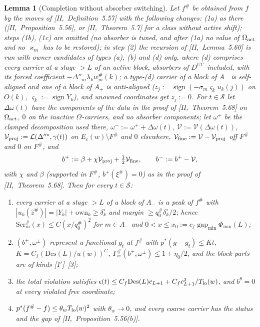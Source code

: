 \documentclass[10pt]{amsart}
\newtheorem{lemma}[theorem]{Lemma}
\theoremstyle{definition}
\theoremstyle{remark}
\newcommand{\sgn}{\operatorname{sign}}
\newcommand{\gap}{\operatorname{gap}}
\newcommand{\zh}{\hat z}
\begin{document}
\begin{lemma}[Completion without absorber switching]\label{lem:III-CMp}
Let $f^\#$ be obtained from $f$ by the moves of [II,~Definition~5.57] with the
following changes: \textup{(1a)} as there \textup{(}[II,~Proposition~5.56], or
[II,~Theorem~5.7] for a class without active shift\textup{)}; steps
\textup{(1b)}, \textup{(1c)} are omitted \textup{(}no absorber is tuned, and
after \textup{(1a)} no value of $\Omega_{\rm act}$ and no $\varkappa_m$ has to be
restored\textup{)}; in step \textup{(2)} the recursion of [II,~Lemma~5.60] is run
with owner candidates of types \textup{(a)}, \textup{(b)} and \textup{(d)} only,
where \textup{(d)} comprises every carrier at a stage $>L$ of an active block,
absorbers of $D^{U1'}$ included, with its forced coefficient $-\Delta''_m
\lambda_kw^\#_m(k)$; a type-\textup{(d)} carrier of a block of $A_-$ is
self-aligned and one of a block of $A_+$ is anti-aligned \textup{(}$z_j:=
\sgn(-\sigma_m\varsigma_ku_k(j))$ on $O(k)$, $\varsigma_k:=\sgn Y_k$\textup{)},
and unowned coordinates get $z_j:=0$.  For $t\in\mathcal S$ let $\Delta\omega(t)$
have the components of the data in the proof of [II,~Theorem~5.68] on $\Omega_{\rm act}$, $0$ on the
inactive $\Omega$-carriers, and \emph{no} absorber components; let
$\omega^+$ be the clamped decomposition used there, $\omega^-:=\omega^++
\Delta\omega(t)$, $\mathcal V:=\mathcal V(\Delta\omega(t))$, $\mathcal V_{\rm proj}:=
\mathcal L(\Delta''^*,\gamma(t))$ on $E_c(w)\setminus F^\#$ and $0$ elsewhere,
$\mathcal V_{\rm fine}:=\mathcal V-\mathcal V_{\rm proj}$ off $F^\#$ and $0$ on
$F^\#$, and
\[
 b^+:=\beta+\chi\mathcal V_{\rm proj}+\tfrac12\mathcal V_{\rm fine},\qquad
 b^-:=b^+-\mathcal V,
\]
with $\chi$ and $\beta$ \textup{(}supported in $F^\#$, $b^+(\xi^\#)=0$\textup{)} as in
the proof of [II,~Theorem~5.68].  Then for every $t\in\mathcal S$:
\begin{enumerate}
\item[(a)] every carrier at a stage $>L$ of a block of $A_-$ is a peak of $f^\#$ with
$|u_k(\zh^\#)|=|Y_k|+\mathrm{own}_k\ge\delta^\circ_k$ and margin $\ge q^\#_0
\delta^\circ_k/2$; hence $\mathrm{Scr}^\#_m(x)\le C(x/q^\#_0)^2$ for $m\in A_-$ and
$0<x\le x_0:=c_f\gap_{\min}\Phi_{\min}(L)$;
\item[(b)] $(b^\pm,\omega^\pm)$ represent a functional $g_t$ at $f^\#$ with
$p^*(g-g_t)\le Kt$, $K=C_f(\mathrm{Des}(L)/u(w))^C$, $\Gamma^\#_w(b^\pm,\omega^\pm)
\le1+\eta_0/2$, and the block parts are of kinds \textup{[1$'$]--[3]};
\item[(c)] the total violation satisfies $\epsilon(t)\le C_f\mathrm{Des}(L)c_{L+1}+
C_fc_{L+1}^2/T_{\rm lo}(w)$, and $b^\theta=0$ at every violated free coordinate;
\item[(d)] $p^*(f^\#-f)\le\theta_wT_{\rm lo}(w)^2$ with $\theta_w\to0$, and every
coarse carrier has the status and the gap of [II,~Proposition~5.56(b)].
\end{enumerate}
\end{lemma}
\end{document}
